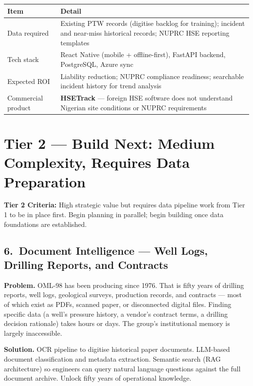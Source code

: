 \documentclass[10pt]{article}
\begin{document}
\vspace{4pt}
\small
\begin{tabularx}{\columnwidth}{@{}lX@{}}
\toprule
\textbf{Item} & \textbf{Detail} \\
\midrule
Data required     & Existing PTW records (digitise backlog for training); incident
                    and near-miss historical records; NUPRC HSE reporting templates \\
Tech stack        & React Native (mobile + offline-first), FastAPI backend,
                    PostgreSQL, Azure sync \\
Expected ROI      & Liability reduction; NUPRC compliance readiness; searchable
                    incident history for trend analysis \\
Commercial product & \textbf{HSETrack} --- foreign HSE software does not understand
                    Nigerian site conditions or NUPRC requirements \\
\bottomrule
\end{tabularx}
\normalsize

\vspace{10pt}

\section{Tier 2 --- Build Next: Medium Complexity, Requires Data Preparation}

\noindent\colorbox{tier2!8}{%
\begin{minipage}{\dimexpr\textwidth-2\fboxsep}
  \vspace{3pt}
  {\small\color{tier2}\textbf{Tier 2 Criteria:}
  High strategic value but requires data pipeline work from Tier 1 to be in place first.
  Begin planning in parallel; begin building once data foundations are established.}
  \vspace{3pt}
\end{minipage}}

\vspace{6pt}

\subsection*{6.\ Document Intelligence --- Well Logs, Drilling Reports, and Contracts}

{\small
\textbf{Problem.}
OML-98 has been producing since 1976. That is fifty years of drilling reports, well logs,
geological surveys, production records, and contracts --- most of which exist as PDFs,
scanned paper, or disconnected digital files. Finding specific data (a well's pressure
history, a vendor's contract terms, a drilling decision rationale) takes hours or days.
The group's institutional memory is largely inaccessible.

\vspace{4pt}
\textbf{Solution.}
OCR pipeline to digitise historical paper documents. LLM-based document classification
and metadata extraction. Semantic search (RAG architecture) so engineers can query
natural language questions against the full document archive. Unlock fifty years of
operational knowledge.
}
\end{document}
